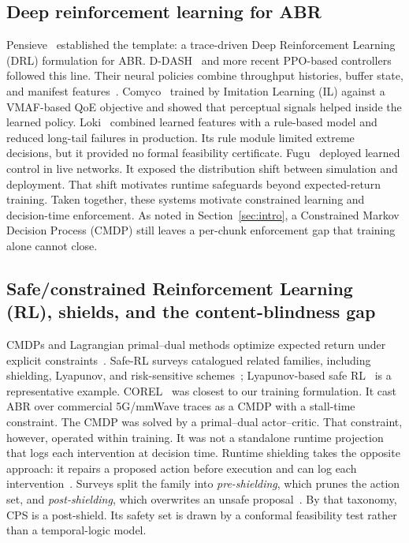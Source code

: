 \subsection{Deep reinforcement learning for ABR}

Pensieve~\cite{mao2017neural} established the template: a trace-driven Deep Reinforcement Learning (DRL) formulation for ABR.
D-DASH~\cite{gadaleta2017ddash} and more recent PPO-based controllers~\cite{naresh2023ppoabr} followed this line.
Their neural policies combine throughput histories, buffer state, and manifest features~\cite{sutton2018reinforcement}.
Comyco~\cite{huang2019comyco} trained by Imitation Learning (IL) against a VMAF-based QoE objective and showed that perceptual signals helped inside the learned policy.
Loki~\cite{zhang2021loki} combined learned features with a rule-based model and reduced long-tail failures in production.
Its rule module limited extreme decisions, but it provided no formal feasibility certificate.
Fugu~\cite{yan2019learning} deployed learned control in live networks. It exposed the distribution shift between simulation and deployment. That shift motivates runtime safeguards beyond expected-return training.
Taken together, these systems motivate constrained learning and decision-time enforcement.
As noted in Section~\ref{sec:intro}, a Constrained Markov Decision Process (CMDP) still leaves a per-chunk enforcement gap that training alone cannot close.

\subsection{Safe/constrained Reinforcement Learning (RL), shields, and the content-blindness gap}

CMDPs and Lagrangian primal--dual methods optimize expected return under explicit constraints~\cite{altman1999constrained,paternain2019dual,achiam2017constrained}.
Safe-RL surveys catalogued related families, including shielding, Lyapunov, and risk-sensitive schemes~\cite{gu2024safereview}; Lyapunov-based safe RL~\cite{chow2018lyapunov} is a representative example.
COREL~\cite{hu2023corel} was closest to our training formulation.
It cast ABR over commercial \mbox{5G/mmWave} traces as a CMDP with a stall-time constraint.
The CMDP was solved by a primal--dual actor--critic.
That constraint, however, operated within training. It was not a standalone runtime projection that logs each intervention at decision time.
Runtime shielding takes the opposite approach: it repairs a proposed action before execution and can log each intervention~\cite{alshiekh2018shielding}.
Surveys split the family into \emph{pre-shielding}, which prunes the action set, and \emph{post-shielding}, which overwrites an unsafe proposal~\cite{konighofer2025shields}.
By that taxonomy, CPS is a post-shield.
Its safety set is drawn by a conformal feasibility test rather than a temporal-logic model.

